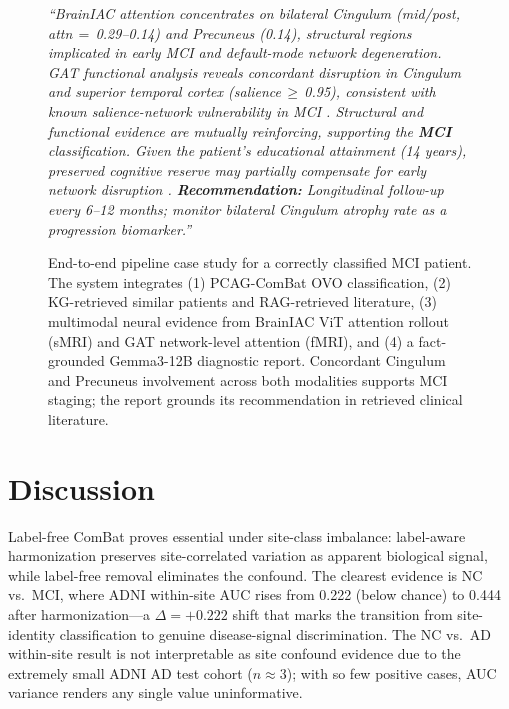 \documentclass[conference]{IEEEtran}
\begin{document}
\begin{figure}[t]
\begin{tcolorbox}
\vspace{4pt}
\begin{tcolorbox}[enhanced, colframe=gray!50, colback=blue!3,
  title={\small\textbf{(4) Gemma3-12B Generated Report (excerpt, translated from Traditional Chinese)}},
  coltitle=black, top=2pt, bottom=2pt, left=3pt, right=3pt, boxrule=0.4pt, arc=2pt]
\small\itshape
``BrainIAC attention concentrates on bilateral Cingulum (mid/post, attn\,$=$\,0.29--0.14) and
Precuneus (0.14), structural regions implicated in early MCI and default-mode network
degeneration. GAT functional analysis reveals concordant disruption in Cingulum and
superior temporal cortex (salience\,$\geq$\,0.95), consistent with known salience-network
vulnerability in MCI \cite{vemuri2014cognitive}. Structural and functional evidence
are mutually reinforcing, supporting the \textbf{MCI} classification.
Given the patient's educational attainment (14 years), preserved cognitive reserve may
partially compensate for early network disruption \cite{vemuri2014cognitive}.
\textbf{Recommendation:} Longitudinal follow-up every 6--12 months; monitor bilateral
Cingulum atrophy rate as a progression biomarker.''
\end{tcolorbox}
\end{tcolorbox}
\caption{End-to-end pipeline case study for a correctly classified MCI patient. The system
integrates (1) PCAG-ComBat OVO classification, (2) KG-retrieved similar patients and
RAG-retrieved literature, (3) multimodal neural evidence from BrainIAC ViT attention
rollout (sMRI) and GAT network-level attention (fMRI), and (4) a fact-grounded
Gemma3-12B diagnostic report. Concordant Cingulum and Precuneus involvement across
both modalities supports MCI staging; the report grounds its recommendation in
retrieved clinical literature.}
\label{fig:casestudy}
\end{figure}

\section{Discussion}

Label-free ComBat proves essential under site-class imbalance: label-aware harmonization preserves site-correlated variation as apparent biological signal, while label-free removal eliminates the confound. The clearest evidence is NC vs.\ MCI, where ADNI within-site AUC rises from 0.222 (below chance) to 0.444 after harmonization---a $\Delta{=}{+}0.222$ shift that marks the transition from site-identity classification to genuine disease-signal discrimination. The NC vs.\ AD within-site result is not interpretable as site confound evidence due to the extremely small ADNI AD test cohort ($n{\approx}3$); with so few positive cases, AUC variance renders any single value uninformative.
\end{document}
